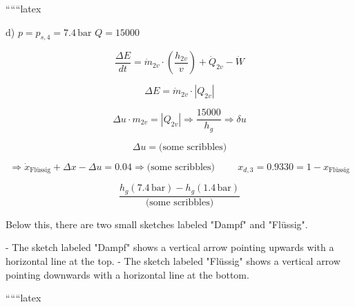 ``````latex


d) $p = p_{s,4} = 7.4 \, \text{bar}$ \hspace{1cm} $Q = 15000$

\[
\frac{\Delta E}{dt} = \dot{m}_{2v} \cdot \left( \frac{h_{2v}}{v} \right) + \dot{Q}_{2v} - \dot{W}
\]

\[
\Delta E = \dot{m}_{2v} \cdot \left| Q_{2v} \right|
\]

\[
\Delta u \cdot m_{2v} = \left| Q_{2v} \right| \Rightarrow \frac{15000}{h_{g}} \Rightarrow \delta u
\]

\[
\Delta u = \text{(some scribbles)}
\]

\[
\Rightarrow \dot{x}_{\text{Flüssig}} + \Delta x - \Delta u = 0.04 \Rightarrow \text{(some scribbles)} \hspace{1cm} x_{d,3} = 0.9330 = 1 - x_{\text{Flüssig}}
\]

\[
\frac{h_{g} (7.4 \, \text{bar}) - h_{g} (1.4 \, \text{bar})}{\text{(some scribbles)}}
\]

Below this, there are two small sketches labeled "Dampf" and "Flüssig". 

- The sketch labeled "Dampf" shows a vertical arrow pointing upwards with a horizontal line at the top. 
- The sketch labeled "Flüssig" shows a vertical arrow pointing downwards with a horizontal line at the bottom.

``````latex


